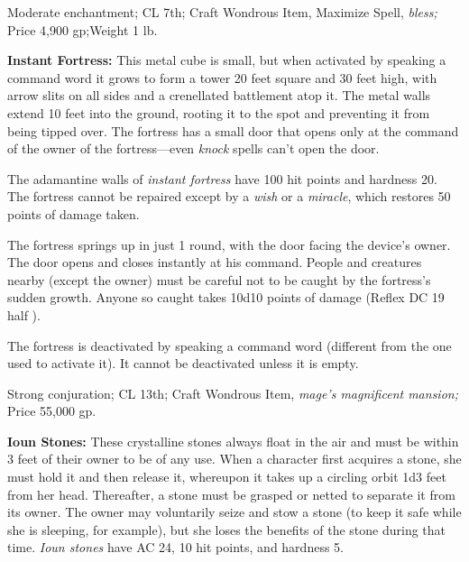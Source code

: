 \documentclass{article}
\begin{document}
Moderate enchantment; CL 7th; Craft Wondrous Item, Maximize Spell, \textit{bless; 
}Price 4,900 gp;Weight 1 lb.

\textbf{Instant Fortress:} This metal cube is small, but when activated by speaking 
a command word it grows to form a tower 20 feet square and 30 feet high, with arrow 
slits on all sides and a crenellated battlement atop it. The metal walls extend 
10 feet into the ground, rooting it to the spot and preventing it from being tipped 
over. The fortress has a small door that opens only at the command of the owner 
of the fortress---even \textit{knock }spells can't open the door.

The adamantine walls of \textit{instant fortress }have 100 hit points and hardness 
20. The fortress cannot be repaired except by a \textit{wish }or a \textit{miracle}, 
which restores 50 points of damage taken.

The fortress springs up in just 1 round, with the door facing the device's owner. 
The door opens and closes instantly at his command. People and creatures nearby 
(except the owner) must be careful not to be caught by the fortress's sudden growth. 
Anyone so caught takes 10d10 points of damage (Reflex DC 19 half ).

The fortress is deactivated by speaking a command word (different from the one 
used to activate it). It cannot be deactivated unless it is empty.

Strong conjuration; CL 13th; Craft Wondrous Item, \textit{mage's magnificent mansion; 
}Price 55,000 gp.

\textbf{Ioun Stones:} These crystalline stones always float in the air and must 
be within 3 feet of their owner to be of any use. When a character first acquires 
a stone, she must hold it and then release it, whereupon it takes up a circling 
orbit 1d3 feet from her head. Thereafter, a stone must be grasped or netted to 
separate it from its owner. The owner may voluntarily seize and stow a stone (to 
keep it safe while she is sleeping, for example), but she loses the benefits of 
the stone during that time. \textit{Ioun stones }have AC 24, 10 hit points, and 
hardness 5.
\end{document}
